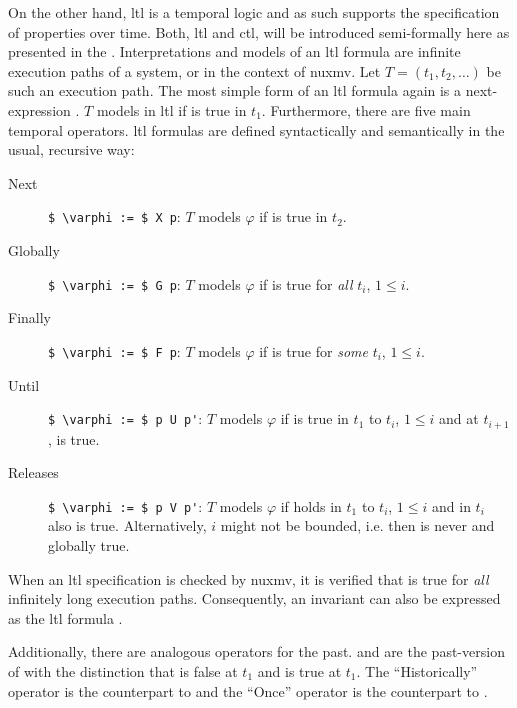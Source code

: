 On the other hand, \gls{ltl} is a temporal logic and as such supports the specification of properties over time.
Both, \gls{ltl} and \gls{ctl}, will be introduced semi-formally here as presented in the  \cite{nuXmv}.
Interpretations and models of an \gls{ltl} formula are infinite execution paths of a system, or in the context of \gls{nuxmv}.
Let $ T = (t_1, t_2, \dots) $ be such an execution path.
The most simple form of an \gls{ltl} formula again is a next-expression .
$ T $ models  in \gls{ltl} if  is true in $ t_1 $.
Furthermore, there are five main temporal operators.
\gls{ltl} formulas are defined syntactically and semantically in the usual, recursive way:
\begin{description}
    \item[Next] \lstinline[language=smv,mathescape=true]{$ \varphi := $ X p}: $ T $ models $ \varphi $ if  is true in $ t_2 $.
    \item[Globally] \lstinline[language=smv,mathescape=true]{$ \varphi := $ G p}: $ T $ models $ \varphi $ if  is true for \textit{all} $ t_i $, $ 1 \leq i $.
    \item[Finally] \lstinline[language=smv,mathescape=true]{$ \varphi := $ F p}: $ T $ models $ \varphi $ if  is true for \textit{some} $ t_i $, $ 1 \leq i $.
    \item[Until] \lstinline[language=smv,mathescape=true]{$ \varphi := $ p U p'}: $ T $ models $ \varphi $ if  is true in $ t_1 $ to $ t_i $, $ 1 \leq i $ and at $ t_{i + 1} $,  is true.
    \item[Releases] \lstinline[language=smv,mathescape=true]{$ \varphi := $ p V p'}: $ T $ models $ \varphi $ if  holds in $ t_1 $ to $ t_i $, $ 1 \leq i $ and in $ t_i $ also  is true.
    Alternatively, $ i $ might not be bounded, i.e.  then is never and  globally true.
\end{description}

When an \gls{ltl} specification  is checked by \gls{nuxmv}, it is verified that  is true for \textit{all} infinitely long execution paths.
Consequently, an invariant  can also be expressed as the \gls{ltl} formula .

Additionally, there are analogous operators for the past.
 and  are the past-version of  with the distinction that  is false at $ t_1 $ and  is true at $ t_1 $.
The \enquote{Historically} operator  is the counterpart to  and the \enquote{Once} operator  is the counterpart to .

